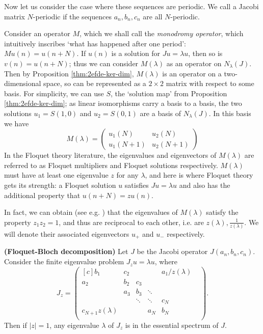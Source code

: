 \documentclass[../main.tex]{subfiles}
\begin{document}
Now let us consider the case where these sequences are periodic. We call a
Jacobi matrix $N$-periodic if the sequences $a_n, b_n, c_n$ are all
$N$-periodic.

Consider an operator $M$, which we shall call the \emph{monodromy
operator}, which intuitively inscribes `what has
happened after one period': $Mu(n) = u(n+N)$. If $u(n)$ is a solution for $Ju =
\lambda u$, then so is $v(n) = u(n+N)$; thus we can consider $M(\lambda)$ as an
operator on $N_\lambda (J)$. Then by Proposition \ref{thm:2efde-ker-dim},
$M(\lambda)$ is an operator on a two-dimensional space, so can be represented as
a $2 \times 2$ matrix with respect to some basis. For simplicity, we can use
$S$, the `solution map' from Proposition \ref{thm:2efde-ker-dim}; as linear
isomorphisms carry a basis to a basis, the two solutions $u_1 = S(1, 0)$ and
$u_2 = S(0, 1)$ are a basis of $N_\lambda (J)$. In this basis we have
  $$
  M(\lambda) =
  \begin{pmatrix}
    u_1(N) & u_2(N) \\
    u_1(N+1) & u_2(N+1)
  \end{pmatrix}
  $$
In the Floquet theory literature, the eigenvalues and eigenvectors of
$M(\lambda)$ are referred to as Floquet multipliers and Floquet solutions
respectively. $M(\lambda)$ must have at least one eigenvalue $z$ for any
$\lambda$, and here is where Floquet theory gets its strength: a Floquet
solution $u$ satisfies $Ju = \lambda u$ and also has the additional property
that $u(n+N) = zu(n).$

In fact, we can obtain (see e.g. \cite{teschl2000jacobi}) that the eigenvalues
of $M(\lambda)$ satisfy the property $z_1 z_2 = 1$, and thus are reciprocal to
each other, i.e. are $z(\lambda), \frac{1}{z(\lambda)}$. We will denote their
associated eigenvectors $u_+$ and $u_-$ respectively.

\begin{proposition}{\textbf{(Floquet-Bloch decomposition)}}
  Let $J$ be the Jacobi operator $J(a_n, b_n, c_n)$. 
  Consider the finite eigenvalue problem $J_z u = \lambda u$, where
  \begin{equation}
  \label{eqn:floquet-bloch}
    J_z =
    \begin{pmatrix*}[c]
      b_1 & c_2 & & & a_1/z(\lambda)\\
      a_2 & b_2 & c_3 & & & \\
      & a_3 & b_3 & \ddots & & \\
      & & \ddots & \ddots & c_N & \\
      c_{N+1} z(\lambda) & & & a_N & b_N\\
    \end{pmatrix*}.
  \end{equation}
Then if $|z|=1$, any eigenvalue $\lambda$ of $J_z$
is in the essential spectrum of $J$.
\end{proposition}
\end{document}

